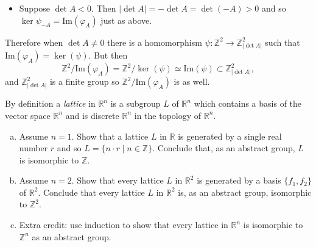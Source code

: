 \documentclass{article}
\newcounter{Problem}
\newenvironment{Problem}{\begin{Exercise}[name={Problem},
                                          counter={Problem}]}
                        {\end{Exercise}}
\begin{document}
\begin{Answer}
\begin{enumerate}[(a)]
{\begin{itemize}
{$$\begin{array}{c}
           au + bv \\
           cu + dv
         \end{array}\right)
         \in \mathrm{Im}(\varphi_A).
         $$
         Therefore $\alpha \in \mathrm{Im}(\varphi_A)$, so
         $\ker(\psi_{A}) \subset \mathrm{Im}(\varphi_A)$.
         We conclude that
         $\ker(\psi_{A}) = \mathrm{Im}(\varphi_A)$.
      }
      \item{
        Suppose $\det A < 0$. Then $|\det A| = -\det A = \det (-A) > 0$
        and so $\ker \psi_{-A} = \mathrm{Im}(\varphi_A)$ just as above.
      }
    \end{itemize}

    Therefore when $\det A \neq 0$ there is a homomorphism
    $\psi : \mathbb{Z}^2 \to \mathbb{Z}_{|\det A|}^2$ such that
    $\mathrm{Im}(\varphi_A) = \ker(\psi)$. But then
    $$
    \mathbb{Z}^2 / \mathrm{Im}(\varphi_A) =
    \mathbb{Z}^2 / \ker(\psi) \simeq
    \mathrm{Im}(\psi) \subset \mathbb{Z}_{|\det A|}^2,
    $$
    and $\mathbb{Z}_{|\det A|}^2$ is a finite group so
    $\mathbb{Z}^2 / \mathrm{Im}(\varphi_A)$ is as well.
  }
\end{enumerate}
\end{Answer}

\pagebreak

\begin{Problem}
By definition a \emph{lattice} in $\mathbb{R}^n$ is a subgroup $L$ of
$\mathbb{R}^n$ which contains a basis of the vector space
$\mathbb{R}^n$ and is discrete
$\mathbb{R}^n$ in the topology of $\mathbb{R}^n$.
\begin{enumerate}[(a)]
  \item{
    Assume $n = 1$. Show that a lattice $L$ in $\mathbb{R}$ is
    generated by a single real number $r$ and so
    $L = \{ n \cdot r \mid n \in \mathbb{Z} \}$. Conclude that, as an
    abstract group, $L$ is isomorphic to $\mathbb{Z}$.
  }
  \item{
    Assume $n = 2$. Show that every lattice $L$ in $\mathbb{R}^2$ is
    generated by a basis $\{f_1, f_2\}$ of $\mathbb{R}^2$. Conclude
    that every lattice $L$ in $\mathbb{R}^2$ is, as an abstract group,
    isomorphic to $\mathbb{Z}^2$.
  }
  \item{
    Extra credit: use induction to show that every lattice in
    $\mathbb{R}^n$ is isomorphic to $\mathbb{Z}^n$ as an abstract group.
  }
\end{enumerate}
\end{Problem}
\end{document}
